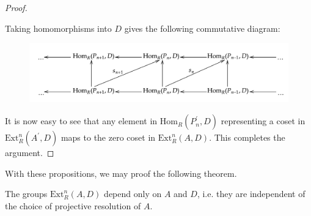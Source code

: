 \begin{proof}
\begin{center}
\begin{tikzpicture}[x=0.75pt,y=0.75pt,yscale=-1,xscale=1]
\end{tikzpicture}
\end{center}
Taking homomorphisms into $D$ gives the following commutative diagram: 
\begin{figure}[htbp]
    \center
    \includegraphics[scale=0.29]{Images/diagram-20240314 (2).png}
\end{figure}
It is now easy to see that any element in $\mathrm{Hom}_R(P_n^\prime,D)$ representing a coset in $\mathrm{Ext}_R^n(A^\prime,D)$ maps to the zero coset in $\mathrm{Ext}_R^n(A,D)$. This completes the argument.
\end{proof}
With these propositions, we may proof the following theorem.
\begin{theorem}
The groups $\mathrm{Ext}_R^n(A,D)$ depend only on $A$ and $D$, i.e. they are independent of the choice of projective resolution of $A$.
\end{theorem}
